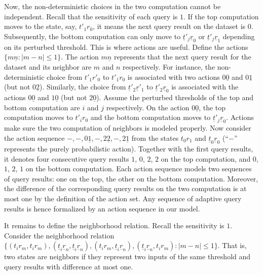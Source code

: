 Now, the non-deterministic choices in the two computation cannot be 
independent. Recall that the sensitivity of each query is
$1$. If the top computation moves to the state, say, $t'_1r_0$, it
means the next query result on the dataset is $0$. Subsequently, the
bottom computation can only move to $\underline{t}'_j\underline{r}_0$
or $\underline{t}'_j\underline{r}_1$ depending on its perturbed
threshold. This is where actions are useful. Define the actions
$\{ m\underline{n} : |m - n| \leq 1 \}$. The action
$m\underline{n}$ represents that the next query result for the dataset
and its neighbor are $m$ and $n$ respectively. For instance, the
non-deterministic choice from $t'_1r'_0$ to $t'_1r_0$ is associated
with two actions $0\underline{0}$ and $0\underline{1}$ (but not
$0\underline{2}$). Similarly, the choice from
$\underline{t}'_2\underline{r}'_1$ to
$\underline{t}'_2\underline{r}_0$ is associated with the actions
$0\underline{0}$ and $1\underline{0}$ (but not $2\underline{0}$). 
Assume the perturbed thresholds of the top and bottom computation are
$i$ and $j$ respectively. On the action $0\underline{0}$, the top
computation moves to $t'_ir_0$ and 
the bottom computation moves to $\underline{t}'_j\underline{r}_0$.
Actions make sure the two computation of neighbors
is modeled properly. Now consider the action sequence
$-,-,0\underline{1},-,2\underline{2},-,2\underline{1}$ from the states
$t_0r_1$ and $\underline{t}_0\underline{r}_0$ (``$-$'' represents the
purely probabilistic action). Together with the first query results, 
it denotes four consecutive query results $1$, $0$, $2$, $2$ on the
top computation, and $0$, $1$, $2$, $1$ on the bottom computation.
Each action sequence models two sequences of query results: one on the
top, the other on the bottom computation. Moreover, the difference of
the corresponding query results on the two computation is at most one
by the definition of the action set. Any sequence of adaptive query
results is hence formalized by an action sequence in our model.

It remains to define the neighborhood
relation. Recall the sensitivity is $1$. Consider the neighborhood
relation 
$\{ (t_ir_m, t_ir_m),
    (\underline{t}_i\underline{r}_n, \underline{t}_i\underline{r}_n),
    (t_ir_m, \underline{t}_i\underline{r}_n), 
    (\underline{t}_i\underline{r}_n, t_ir_m) : | m - n | \leq 1 \}$.
That is, two states are neighbors if they represent two inputs of the
same threshold and query results with difference at most one.